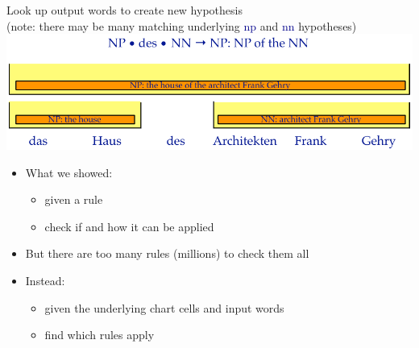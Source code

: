 \documentclass[landscape]{slides}
\newcommand{\example}[1]{\textcolor{darkblue}{\rm #1}}
\begin{document}

\vspace{16mm}
\begin{center}
Look up output words to create new hypothesis\\
(note: there may be many matching underlying \example{\sc np} and \example{\sc nn} hypotheses)\\[15mm]
\includegraphics[scale=1.6]{rule-lookup.pdf}
\end{center}


\vspace{20mm}
\begin{itemize}
\item What we showed:
\begin{itemize}
\item given a rule
\item check if and how it can be applied
\end{itemize}
\item But there are too many rules (millions) to check them all
\item Instead:
\begin{itemize}
\item given the underlying chart cells and input words
\item find which rules apply
\end{itemize}
\end{itemize}

\end{document}
